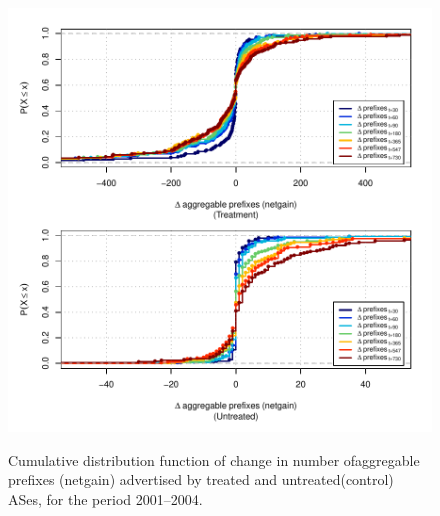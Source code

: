 \begin{figure}[H]
\begin{centering}
\begin{singlespace}
    \includegraphics[width=6in]{figures/behavior-netgain-2001_2004-corr.pdf}
    \vspace{-2em}\\
    \caption{Cumulative distribution function of change in number ofaggregable prefixes (netgain) advertised by treated and untreated(control) ASes, for the period 2001--2004.}
\end{singlespace}
\end{centering}
\end{figure}

